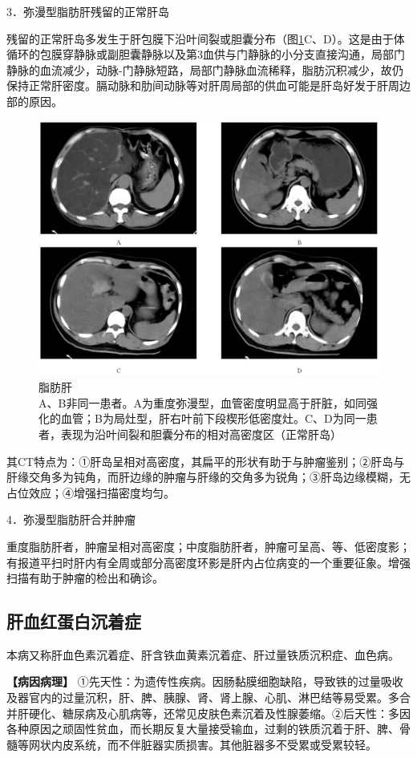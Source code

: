 3．弥漫型脂肪肝残留的正常肝岛

残留的正常肝岛多发生于肝包膜下沿叶间裂或胆囊分布（图\ref{fig11-16}C、D）。这是由于体循环的包膜穿静脉或副胆囊静脉以及第3血供与门静脉的小分支直接沟通，局部门静脉的血流减少，动脉-门静脉短路，局部门静脉血流稀释，脂肪沉积减少，故仍保持正常肝密度。膈动脉和肋间动脉等对肝周局部的供血可能是肝岛好发于肝周边部的原因。

\begin{figure}[!htbp]
 \centering
 \includegraphics[width=.7\textwidth,height=\textheight,keepaspectratio]{./images/Image00288.jpg}
 \captionsetup{justification=centering}
 \caption{脂肪肝\\{\small A、B非同一患者。A为重度弥漫型，血管密度明显高于肝脏，如同强化的血管；B为局灶型，肝右叶前下段楔形低密度灶。C、D为同一患者，表现为沿叶间裂和胆囊分布的相对高密度区（正常肝岛）}}
 \label{fig11-16}
  \end{figure} 

其CT特点为：①肝岛呈相对高密度，其扁平的形状有助于与肿瘤鉴别；②肝岛与肝缘交角多为钝角，而肝边缘的肿瘤与肝缘的交角多为锐角；③肝岛边缘模糊，无占位效应；④增强扫描密度均匀。

4．弥漫型脂肪肝合并肿瘤

重度脂肪肝者，肿瘤呈相对高密度；中度脂肪肝者，肿瘤可呈高、等、低密度影；有报道平扫时肝内有全周或部分高密度环影是肝内占位病变的一个重要征象。增强扫描有助于肿瘤的检出和确诊。

\subsection{肝血红蛋白沉着症}

本病又称肝血色素沉着症、肝含铁血黄素沉着症、肝过量铁质沉积症、血色病。

\textbf{【病因病理】}
①先天性：为遗传性疾病。因肠黏膜细胞缺陷，导致铁的过量吸收及器官内的过量沉积，肝、脾、胰腺、肾、肾上腺、心肌、淋巴结等易受累。多合并肝硬化、糖尿病及心肌病等，还常见皮肤色素沉着及性腺萎缩。②后天性：多因各种原因之顽固性贫血，而长期反复大量接受输血，过剩的铁质沉着于肝、脾、骨髓等网状内皮系统，而不伴脏器实质损害。其他脏器多不受累或受累较轻。

